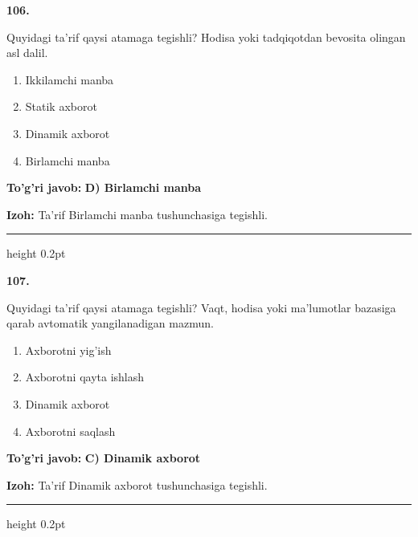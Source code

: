 \documentclass[10pt,a4paper,oneside]{article}
\begin{document}
\noindent\textbf{\color{ink}106.}
\par
Quyidagi ta'rif qaysi atamaga tegishli? Hodisa yoki tadqiqotdan bevosita olingan asl dalil.
\begin{enumerate}[label=\Alph*),leftmargin=9mm]
\item Ikkilamchi manba
\item Statik axborot
\item Dinamik axborot
\item Birlamchi manba
\end{enumerate}
\begin{tcolorbox}[enhanced,breakable,colback=teal!4,colframe=teal!50!black,boxrule=0.5pt,arc=1.1mm,left=3mm,right=3mm,top=1.7mm,bottom=1.7mm,before skip=2mm,after skip=2mm]
\textbf{\color{teal}To'g'ri javob:} \textbf{D) Birlamchi manba}
\par\smallskip
\textbf{Izoh:} Ta'rif Birlamchi manba tushunchasiga tegishli.
\end{tcolorbox}
\vspace{2mm}\hrule height 0.2pt \vspace{3mm}

\noindent\textbf{\color{ink}107.}
\par
Quyidagi ta'rif qaysi atamaga tegishli? Vaqt, hodisa yoki ma'lumotlar bazasiga qarab avtomatik yangilanadigan mazmun.
\begin{enumerate}[label=\Alph*),leftmargin=9mm]
\item Axborotni yig'ish
\item Axborotni qayta ishlash
\item Dinamik axborot
\item Axborotni saqlash
\end{enumerate}
\begin{tcolorbox}[enhanced,breakable,colback=teal!4,colframe=teal!50!black,boxrule=0.5pt,arc=1.1mm,left=3mm,right=3mm,top=1.7mm,bottom=1.7mm,before skip=2mm,after skip=2mm]
\textbf{\color{teal}To'g'ri javob:} \textbf{C) Dinamik axborot}
\par\smallskip
\textbf{Izoh:} Ta'rif Dinamik axborot tushunchasiga tegishli.
\end{tcolorbox}
\vspace{2mm}\hrule height 0.2pt \vspace{3mm}
\end{document}
